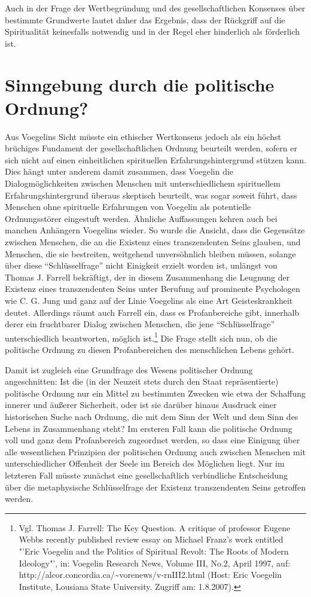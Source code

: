 Auch in der Frage der Wertbegründung und des gesellschaftlichen Konsenses über
bestimmte Grundwerte lautet daher das Ergebnis, dass der Rückgriff auf die
Spiritualität keinesfalls notwendig und in der Regel eher hinderlich als
förderlich ist.

\section{Sinngebung durch die politische Ordnung?}

Aus Voegelins Sicht müsste ein ethischer Wertkonsens jedoch als ein höchst
brüchiges Fundament der gesellschaftlichen Ordnung beurteilt werden, sofern er
sich nicht auf einen einheitlichen spirituellen Erfahrungshintergrund stützen
kann. Dies hängt unter anderem damit zusammen, dass Voegelin die
Dialogmöglichkeiten zwischen Menschen mit unterschiedlichem spirituellem
Erfahrungshintergrund überaus skeptisch beurteilt, was sogar soweit führt,
dass Menschen ohne spirituelle Erfahrungen von Voegelin als potentielle
Ordnungsstörer eingestuft werden. Ähnliche Auffassungen kehren auch bei
manchen Anhängern Voegelins wieder. So wurde die Ansicht, dass die Gegensätze
zwischen Menschen, die an die Existenz eines transzendenten Seins glauben, und
Menschen, die sie bestreiten, weitgehend unversöhnlich bleiben müssen, solange
über diese "`Schlüsselfrage"' nicht Einigkeit erzielt worden ist, unlängst von
Thomas J. Farrell bekräftigt, der in diesem Zusammenhang die Leugnung der
Existenz eines transzendenten Seins unter Berufung auf prominente Psychologen
wie C. G. Jung und ganz auf der Linie Voegelins als eine Art Geisteskrankheit
deutet. Allerdings räumt auch Farrell ein, dass es Profanbereiche gibt,
innerhalb derer ein fruchtbarer Dialog zwischen Menschen, die jene
"`Schlüsselfrage"' unterschiedlich beantworten, möglich ist.\footnote{Vgl.
  Thomas J.  Farrell: The Key Question. A critique of professor Eugene Webbs
  recently published review essay on Michael Franz's work entitled "'Eric
  Voegelin and the Politics of Spiritual Revolt: The Roots of Modern
  Ideology"', in: Voegelin Research News, Volume III, No.2, April 1997, auf:
  http://alcor.concordia.ca/\~{ }vorenews/v-rnIII2.html (Host: Eric Voegelin
  Institute, Lousiana State University. Zugriff am: 1.8.2007).} Die Frage
stellt sich nun, ob die politische Ordnung zu diesen Profanbereichen des
menschlichen Lebens gehört.

Damit ist zugleich eine Grundfrage des Wesens politischer Ordnung
angeschnitten: Ist die (in der Neuzeit stets durch den Staat
repräsentierte) politische Ordnung nur ein Mittel zu bestimmten Zwecken
wie etwa der Schaffung innerer und äußerer Sicherheit, oder ist sie
darüber hinaus Ausdruck einer historischen Suche nach Ordnung, die mit
dem Sinn der Welt und dem Sinn des Lebens in Zusammenhang steht? Im
ersteren Fall kann die politische Ordnung voll und ganz dem
Profanbereich zugeordnet werden, so dass eine Einigung über alle
wesentlichen Prinzipien der politischen Ordnung auch zwischen Menschen
mit unterschiedlicher Offenheit der Seele im Bereich des Möglichen
liegt. Nur im letzteren Fall müsste zunächst eine gesellschaftlich
verbindliche Entscheidung über die metaphysische Schlüsselfrage der
Existenz transzendenten Seins getroffen werden.

